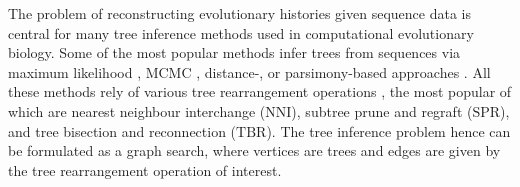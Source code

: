\documentclass[11pt]{amsart}
\newcommand{\nni}{\mathrm{NNI}}
\newcommand{\spr}{\mathrm{SPR}}
\newcommand{\tbr}{\mathrm{TBR}}
\newcommand{\summary}[1]{} %
\begin{document}
\summary{Motivation: many popular tree search algorithms are based on NNI (e.g. this \url{https://academic.oup.com/mbe/article/28/10/2731/973375} tool has been cited 40K+ times, see also references there to PhyML, RaxML, etc. -- they all use NNI); other applications include tree comparison methods, tree inference methods (proposal distributions), summary statistics, etc.}
The problem of reconstructing evolutionary histories given sequence data is central for many tree inference methods used in computational evolutionary biology.
Some of the most popular methods infer trees from sequences via maximum likelihood \autocite{Stamatakis2006-xb, Guindon2010-lo}, MCMC \autocite{Ronquist2003-eq, Suchard2018-tw, Bouckaert2019-yr}, distance-, or parsimony-based approaches \autocite{Tamura2011-ky}.
All these methods rely of various tree rearrangement operations \autocite{Semple2003-nj}, the most popular of which are nearest neighbour interchange ($\nni$), subtree prune and regraft ($\spr$), and tree bisection and reconnection ($\tbr$).
The tree inference problem hence can be formulated as a graph search, where vertices are trees and edges are given by the tree rearrangement operation of interest.
\end{document}
